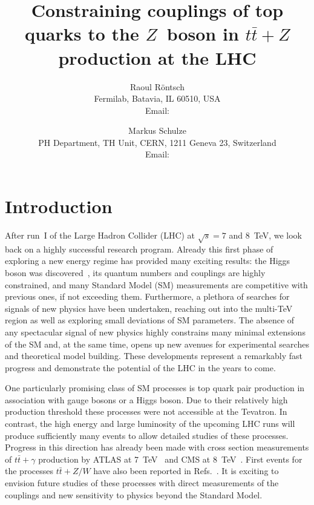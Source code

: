\documentclass{JHEP3}
\title{Constraining couplings of top quarks to the $Z$~boson in $t\bar{t}+Z$ production at the LHC}
\author{Raoul R\"ontsch \\ Fermilab, Batavia, IL 60510, USA \\
  Email: \email{rontsch@fnal.gov} }
\author{Markus Schulze \\ PH Department, TH Unit, CERN, 1211 Geneva 23, Switzerland \\
  Email: \email{markus.schulze@cern.ch} }
\def\ttb{t\bar{t}}
\begin{document}
\section{Introduction}
After run~I of the Large Hadron Collider (LHC) at $\sqrt{s}=7$ and 8~TeV, we look back on a highly successful research program.
Already this first phase of exploring a new energy regime has provided many exciting results: 
the Higgs boson was discovered~\cite{Chatrchyan:2012ufa,Aad:2012tfa}, its quantum numbers and couplings are highly constrained,
and many Standard Model (SM) measurements are competitive with previous ones, if not exceeding them.
Furthermore, a plethora of searches for signals of new physics have been undertaken, reaching out into the multi-TeV region as well as
exploring small deviations of SM parameters. 
The absence of any spectacular signal of new physics highly constrains many minimal extensions of the SM and, at the same time, 
opens up new avenues for
experimental searches and theoretical model building.
These developments represent a remarkably fast progress and demonstrate the potential of the LHC in the years to come.

One particularly promising class of SM processes is top quark pair production in association with gauge bosons or a Higgs boson.
Due to their relatively high production threshold these processes were not accessible at the Tevatron. 
In contrast, the high energy and large luminosity of the upcoming LHC runs will produce sufficiently many events to allow detailed studies of these processes.
Progress in this direction has already been made with cross section measurements of $\ttb+\gamma$ production by ATLAS at 7~TeV~\cite{ATLAS:2011nka}  
and CMS at 8~TeV~\cite{CMS:2014wma}. First events for the processes $\ttb+Z/W$  have also been reported in Refs.~\cite{ATLAS-CONF-2012-126,Chatrchyan:2013qca}.
It is exciting to envision future studies of these processes with direct measurements of the couplings and new sensitivity to physics beyond the Standard Model. 
\end{document}
